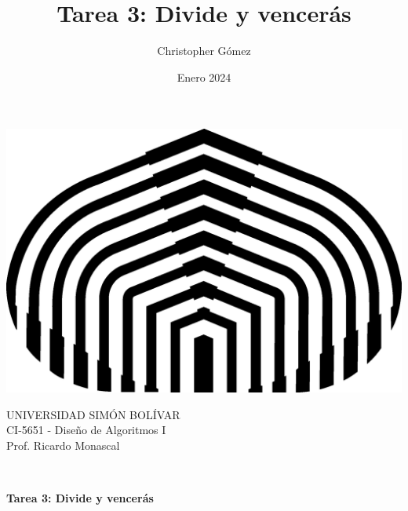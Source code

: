 \documentclass[letterpaper, 12pt]{article}
\title{Tarea 3: Divide y vencerás}
\author{Christopher Gómez}
\date{Enero 2024}
\begin{document}
\parbox[t]{.5\linewidth}{
    \centering
    \includegraphics[scale=0.4]{logo.png}
    \begin{center}
        UNIVERSIDAD SIMÓN BOLÍVAR \\
        CI-5651 - Diseño de Algoritmos I \\
        Prof. Ricardo Monascal \\
    \end{center}
}
\hfill {}

\phantom{This text will be invisible} \\
\centerline {\textbf{Tarea 3: Divide y vencerás}}
\justify
\end{document}
